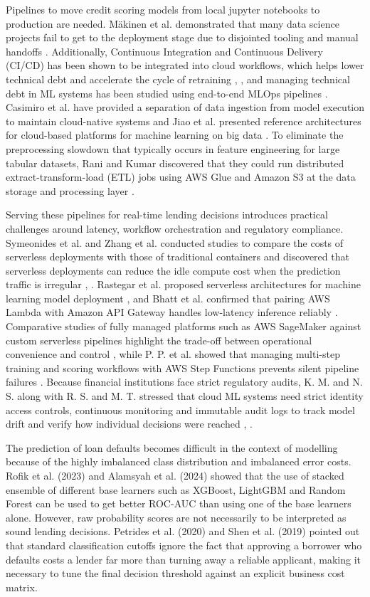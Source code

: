\documentclass[conference]{IEEEtran}
\begin{document}
Pipelines to move credit scoring models from local jupyter notebooks to production are needed. M\"akinen et al. demonstrated that many data science projects fail to get to the deployment stage due to disjointed tooling and manual handoffs \cite{2}. Additionally, Continuous Integration and Continuous Delivery (CI/CD) has been shown to be integrated into cloud workflows, which helps lower technical debt and accelerate the cycle of retraining \cite{5}, \cite{8}, and managing technical debt in ML systems has been studied using end-to-end MLOps pipelines \cite{11}. Casimiro et al. have provided a separation of data ingestion from model execution to maintain cloud-native systems \cite{6} and Jiao et al. presented reference architectures for cloud-based platforms for machine learning on big data \cite{4}. To eliminate the preprocessing slowdown that typically occurs in feature engineering for large tabular datasets, Rani and Kumar discovered that they could run distributed extract-transform-load (ETL) jobs using AWS Glue and Amazon S3 at the data storage and processing layer \cite{9}.

Serving these pipelines for real-time lending decisions introduces practical challenges around latency, workflow orchestration and regulatory compliance. Symeonides et al. and Zhang et al. conducted studies to compare the costs of serverless deployments with those of traditional containers and discovered that serverless deployments can reduce the idle compute cost when the prediction traffic is irregular \cite{1}, \cite{7}. Rastegar et al. proposed serverless architectures for machine learning model deployment \cite{3}, and Bhatt et al. confirmed that pairing AWS Lambda with Amazon API Gateway handles low-latency inference reliably \cite{10}. Comparative studies of fully managed platforms such as AWS SageMaker against custom serverless pipelines highlight the trade-off between operational convenience and control \cite{13}, while P. P. et al. showed that managing multi-step training and scoring workflows with AWS Step Functions prevents silent pipeline failures \cite{14}. Because financial institutions face strict regulatory audits, K. M. and N. S. along with R. S. and M. T. stressed that cloud ML systems need strict identity access controls, continuous monitoring and immutable audit logs to track model drift and verify how individual decisions were reached \cite{12}, \cite{15}.

The prediction of loan defaults becomes difficult in the context of modelling because of the highly imbalanced class distribution and imbalanced error costs. Rofik et al. (2023) and Alamsyah et al. (2024) showed that the use of stacked ensemble of different base learners such as XGBoost, LightGBM and Random Forest can be used to get better ROC-AUC than using one of the base learners alone. However, raw probability scores are not necessarily to be interpreted as sound lending decisions. Petrides et al. (2020) and Shen et al. (2019) pointed out that standard classification cutoffs ignore the fact that approving a borrower who defaults costs a lender far more than turning away a reliable applicant, making it necessary to tune the final decision threshold against an explicit business cost matrix.
\end{document}
